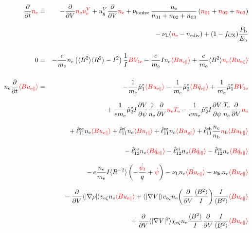 \documentclass[11pt]{article}
\def\r#1{{\rm#1}}
\def\aves#1{\langle#1\rangle}
\def\dd#1#2{\frac{\partial #1}{\partial #2}}
\def\para{\parallel}
\def\ddV{\frac{\partial}{\partial V}}
\def\ddt{\frac{\partial}{\partial t}}
\def\psid{\dot{\psi}}
\def\psit{\psi_t}
\def\psitd{\dot{\psit}}
\def\me{m_\r{e}}
\def\nee{n_\r{e}}
\def\nb{n_\r{b}}
\def\Te{T_\r{e}}
\def\uzt#1{u_{\r{#1}\zeta}}
\def\upara#1{u_{\r{#1}\para}}
\def\qhatpara#1{\hat{q}_{\r{#1}\para}}
\def\uV#1{u_\r{#1}^V}
\def\ugV{u_{g}^V}
\def\chis#1{\chi_\r{#1}}
\def\nun#1{\nu_\r{0#1}}
\def\ndiv#1{n_\r{#1div}}
\def\bri{\aves{B^2}\aves{R^2} - I^2}
\def\Pb{P_\r{b}}
\def\Eb{E_\r{b}}
\def\nna{n_{01}}
\def\nnb{n_{02}}
\def\nnc{n_{03}}
\def\fCX{f_\r{CX}}
\def\nuL{\nu_\r{L}}
\def\nuion{\nu_\r{ionize}}
\def\red#1{\textcolor{red}{#1}}
\begin{document}
%
\begin{eqnarray}
  \ddt \red{\nee}  &=&
%
  - \ddV \red{\nee\uV{e}}
%
  + \ugV \ddV \red{\nee}
%
  + \nuion\, \frac{\nee}{\nna + \nnb + \nnc}\, (\red{\nna} + \red{\nnb}
  + \red{\nnc})
\nonumber\\[3mm]&&{}
%
  - \nuL (\red{\nee} - \ndiv{e})
%
  + (1 - \fCX) \frac{\Pb}{\Eb}
\\[5mm]
  0 &=&
%
  - \frac{e}{\me} \nee \left( \bri \right) \frac{1}{I} \red{BV_{1\r{e}}}
%
  - \frac{e}{\me} I \nee \red{\aves{B\upara{e}}}
%
  + \frac{e}{\me} \aves{B^2} \red{\nee \aves{R\uzt{e}}}
\\[5mm]
  \nee \ddt \red{\aves{B \upara{e}}} &=&
%
  - \frac{1}{\me} \hat{\mu}_1^\r{e} \red{\aves{B \upara{e}}}
  - \frac{1}{\me} \hat{\mu}_2^\r{e} \red{\aves{B \qhatpara{e}}}
%
  + \frac{1}{\me} \hat{\mu}_1^\r{e} \red{BV_{1\r{e}}}
\nonumber\\[3mm]&&{}
%
  + \frac{1}{e\me} \hat{\mu}_2^\r{e} I \dd{V}{\psi} \frac{1}{\nee} \ddV
  \red{\nee \Te}
  - \frac{1}{e\me} \hat{\mu}_2^\r{e} I \dd{V}{\psi} \frac{\Te}{\nee} \ddV
  \red{\nee}
\nonumber\\[3mm]&&{}
%
  + \hat{\ell}_{11}^{\r{ee}} \nee \red{\aves{B \upara{e}}}
  + \hat{\ell}_{11}^{\r{ei}} \nee \red{\aves{B \upara{i}}}
  + \hat{\ell}_{11}^{\r{ez}} \nee \red{\aves{B \upara{z}}}
  + \hat{\ell}_{11}^{\r{eb}} \frac{\nee}{\nb} \red{\nb \aves{B \upara{b}}}
\nonumber\\[3mm]&&{}
%
  - \hat{\ell}_{12}^{\r{ee}} \nee \red{\aves{B \qhatpara{e}}}
  - \hat{\ell}_{12}^{\r{ei}} \nee \red{\aves{B \qhatpara{i}}}
  - \hat{\ell}_{12}^{\r{ez}} \nee \red{\aves{B \qhatpara{z}}}
\nonumber\\[3mm]&&{}
%
  - e \frac{\nee}{\me} I \aves{R^{-2}} \left( - \frac{\red{\psitd}}{q} + \red{\psid} \right)
%
%
  - \nuL \nee \red{\aves{B \upara{e}}}
%
  - \nun{e} \nee \red{\aves{B \upara{e}}}
\nonumber\\[3mm]&&{}
%
  - \ddV \aves{|\nabla \rho|} v_{\r{e}\zeta} \nee \red{\aves{B \upara{e}}}
%
  + \aves{|\nabla V|} v_{\r{e}\zeta} \nee 
  \biggl(\ddV \frac{\aves{B^2}}{I} \biggl) \frac{I}{\aves{B^2}} \red{\aves{B \upara{e}}}
\nonumber\\[3mm]&&{}
%
  + \ddV \aves{|\nabla V|^2} \chis{e\zeta} \nee
  \frac{\aves{B^2}}{I} \ddV \frac{I}{\aves{B^2}} \red{\aves{B \upara{e}}}
\nonumber\\[3mm]&&{}

\end{eqnarray}
\end{document}
